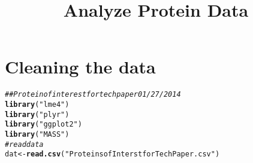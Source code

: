 \documentclass{article}\usepackage[]{graphicx}\usepackage[]{color}
\makeatletter
\newcommand{\hlstr}[1]{\textcolor[rgb]{0.192,0.494,0.8}{#1}}%
\newcommand{\hlcom}[1]{\textcolor[rgb]{0.678,0.584,0.686}{\textit{#1}}}%
\newcommand{\hlstd}[1]{\textcolor[rgb]{0.345,0.345,0.345}{#1}}%
\newcommand{\hlkwb}[1]{\textcolor[rgb]{0.69,0.353,0.396}{#1}}%
\newcommand{\hlkwd}[1]{\textcolor[rgb]{0.737,0.353,0.396}{\textbf{#1}}}%
\newenvironment{kframe}{%
 \def\at@end@of@kframe{}%
 \ifinner\ifhmode%
  \def\at@end@of@kframe{\end{minipage}}%
  \begin{minipage}{\columnwidth}%
 \fi\fi%
 \def\FrameCommand##1{\hskip\@totalleftmargin \hskip-\fboxsep
 \colorbox{shadecolor}{##1}\hskip-\fboxsep
     \hskip-\linewidth \hskip-\@totalleftmargin \hskip\columnwidth}%
 \MakeFramed {\advance\hsize-\width
   \@totalleftmargin\z@ \linewidth\hsize
   \@setminipage}}%
 {\par\unskip\endMakeFramed%
 \at@end@of@kframe}
\newenvironment{knitrout}{}{} %
\makeatother
\begin{document}
\title{Analyze Protein Data}%
\author{} 
\maketitle




\section{Cleaning the data}
\begin{knitrout}
\color{fgcolor}\begin{kframe}
\begin{alltt}
\hlcom{## Protein of interest for tech paper 01/27/2014}
\hlkwd{library}\hlstd{(}\hlstr{"lme4"}\hlstd{)}
\hlkwd{library}\hlstd{(}\hlstr{"plyr"}\hlstd{)}
\hlkwd{library}\hlstd{(}\hlstr{"ggplot2"}\hlstd{)}
\hlkwd{library}\hlstd{(}\hlstr{"MASS"}\hlstd{)}
\hlcom{# read data}
\hlstd{dat} \hlkwb{<-} \hlkwd{read.csv}\hlstd{(}\hlstr{"Proteins of Interst for Tech Paper.csv"}\hlstd{)}


\end{alltt}
\end{kframe}
\end{knitrout}
\end{document}
